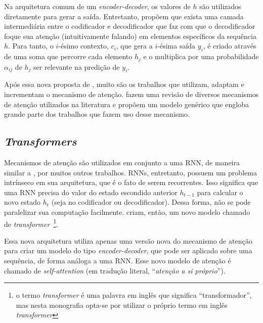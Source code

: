 Na arquitetura comum de um \textit{encoder-decoder}, os valores de $h$ são
utilizados diretamente para gerar a saída. Entretanto,
\cite{bahdanau-etal:2014:attention-mechanism} propõem que exista uma camada
intermediária entre o codificador e decodificador que faz com que o
decodificador foque sua atenção (intuitivamente falando) em elementos
específicos da sequência $h$. Para tanto, o $i$-ésimo contexto, $c_i$, que
gera a $i$-ésima saída $y_i$, é criado através de uma soma que percorre cada
elemento $h_j$ e o multiplica por uma probabilidade $\alpha_{ij}$ de $h_j$ ser
relevante na predição de $y_i$.

Após essa nova proposta de \cite{bahdanau-etal:2014:attention-mechanism}, muito
são os trabalhos que utilizam, adaptam e incrementam o mecanismo de atenção.
\cite{galassi:2021:attention-in-nlp} fazem uma revisão de diversos mecanismos de
atenção utilizados na literatura e propõem um modelo genérico que engloba grande
parte dos trabalhos que fazem uso desse mecanismo.

\subsection{\textit{Transformers}}%
\label{sub:transformers}

Mecanismos de atenção são utilizados em conjunto a uma RNN, de maneira similar a
\cite{bahdanau-etal:2014:attention-mechanism}, por muitos outros trabalhos.
RNNs, entretanto, possuem um problema intrínseco em sua arquitetura, que é o
fato de serem recorrentes. Isso significa que uma RNN precisa do valor do estado
escondido anterior $h_{t-1}$ para calcular o novo estado $h_t$ (seja no
codificador ou decodificador). Dessa forma, não se pode paralelizar sua
computação facilmente. \cite{vaswani-etal:2017:attention-is-all-you-need} criam,
então, um novo modelo chamado de \textit{transformer}~\footnote{o termo
\textit{transformer} é uma palavra em inglês que significa ``transformador'',
mas nesta monografia opta-se por utilizar o próprio termo em inglês
\textit{transformer}}.

Essa nova arquitetura utiliza apenas uma versão nova do mecanismo de atenção
para criar um modelo do tipo \textit{encoder-decoder}, que pode ser aplicado
sobre uma sequência, de forma análoga a uma RNN. Esse novo modelo de atenção é
chamado de \textit{self-attention} (em tradução literal, ``\textit{atenção a si
próprio}'').
